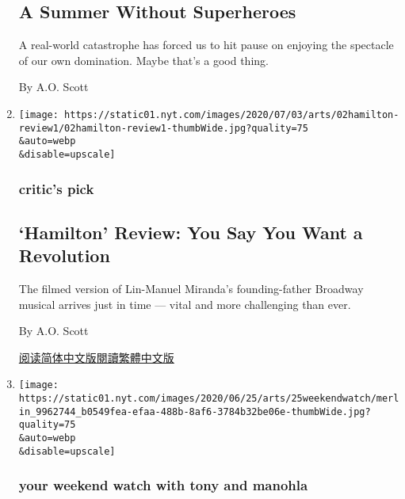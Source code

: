 \begin{enumerate}
  \hypertarget{a-summer-without-superheroes}{%
  \subsection{A Summer Without
  Superheroes}\label{a-summer-without-superheroes}}

  A real-world catastrophe has forced us to hit pause on enjoying the
  spectacle of our own domination. Maybe that's a good thing.

  By A.O. Scott
\item
  \href{/2020/06/30/movies/hamilton-review-disney-plus.html}{}

  \texttt{[image: https://static01.nyt.com/images/2020/07/03/arts/02hamilton-review1/02hamilton-review1-thumbWide.jpg?quality=75\\\&auto=webp\\\&disable=upscale]}

  \hypertarget{critics-pick-2}{%
  \subsubsection{critic's pick}\label{critics-pick-2}}

  \hypertarget{hamilton-review-you-say-you-want-a-revolution}{%
  \subsection{`Hamilton' Review: You Say You Want a
  Revolution}\label{hamilton-review-you-say-you-want-a-revolution}}

  The filmed version of Lin-Manuel Miranda's founding-father Broadway
  musical arrives just in time --- vital and more challenging than ever.

  By A.O. Scott

  \href{https://cn.nytimes.com/culture/20200707/hamilton-review-disney-plus/}{阅读简体中文版}\href{https://cn.nytimes.com/culture/20200707/hamilton-review-disney-plus/zh-hant/}{閱讀繁體中文版}
\item
  \href{/2020/06/25/movies/jurassic-park.html}{}

  \texttt{[image: https://static01.nyt.com/images/2020/06/25/arts/25weekendwatch/merlin\_9962744\_b0549fea-efaa-488b-8af6-3784b32be06e-thumbWide.jpg?quality=75\\\&auto=webp\\\&disable=upscale]}

  \hypertarget{your-weekend-watch-with-tony-and-manohla}{%
  \subsubsection{your weekend watch with tony and
  manohla}\label{your-weekend-watch-with-tony-and-manohla}}


\end{enumerate}
